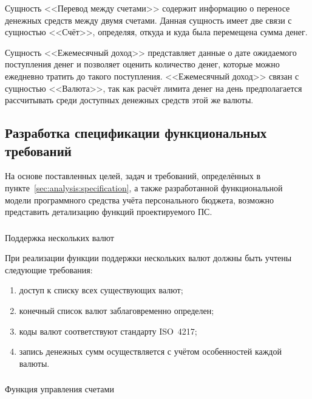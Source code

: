 Сущность <<Перевод между счетами>> содержит информацию о переносе денежных средств между двумя счетами.
Данная сущность имеет две связи с сущностью <<Счёт>>, определяя, откуда и куда была перемещена сумма денег.

Сущность <<Ежемесячный доход>> представляет данные о дате ожидаемого поступления денег и позволяет оценить количество денег, которые можно ежедневно тратить до такого поступления.
<<Ежемесячный доход>> связан с сущностью <<Валюта>>, так как расчёт лимита денег на день предполагается рассчитывать среди доступных денежных средств этой же валюты.

\subsection{Разработка спецификации функциональных требований}
\label{sec:domain:specification}

На основе поставленных целей, задач и требований, определённых в пункте~\ref{sec:analysis:specification}, а также разработанной функциональной модели программного средства учёта персонального бюджета, возможно представить детализацию функций проектируемого ПС.

\subsubsection{} Поддержка нескольких валют
\label{sec:domain:specification:currencies}

При реализации функции поддержки нескольких валют должны быть учтены следующие требования:

\begin{enumerate}
    \item доступ к списку всех существующих валют;
    \item конечный список валют заблаговременно определен;
    \item коды валют соответствуют стандарту ISO~4217;
    \item запись денежных сумм осуществляется с учётом особенностей каждой валюты.
\end{enumerate}

\subsubsection{} Функция управления счетами
\label{sec:domain:specification:wallets}

